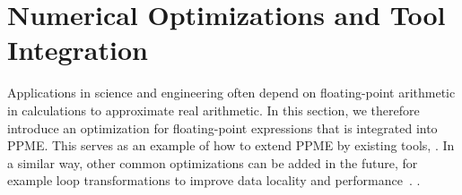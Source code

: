 
\section{Numerical Optimizations and Tool Integration}
\label{sec:analysis}
Applications in science and engineering often depend on floating-point
arithmetic in calculations to approximate real arithmetic. In this section, we
therefore introduce an  optimization for floating-point expressions that is
integrated into PPME. 
This serves as an example of how to extend PPME by existing tools, 
. 
In a similar way, other common optimizations can be added in the future, 
for example loop transformations to improve data locality and 
performance~\cite{Lam1991,luporini_coffee_2015}.
.

